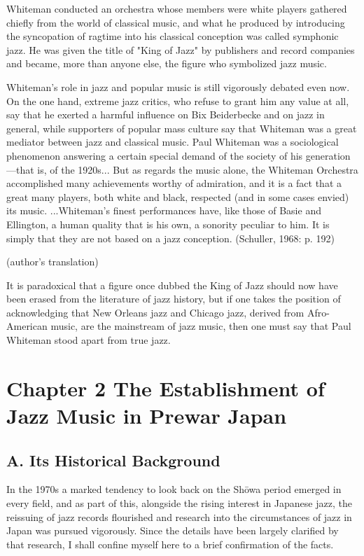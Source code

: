 Whiteman conducted an orchestra whose members were white players gathered chiefly from the world of classical music, and what he produced by introducing the syncopation of ragtime into his classical conception was called symphonic jazz. He was given the title of "King of Jazz" by publishers and record companies and became, more than anyone else, the figure who symbolized jazz music.

\begin{gquote}
Whiteman's role in jazz and popular music is still vigorously debated even now. On the one hand, extreme jazz critics, who refuse to grant him any value at all, say that he exerted a harmful influence on Bix Beiderbecke and on jazz in general, while supporters of popular mass culture say that Whiteman was a great mediator between jazz and classical music. Paul Whiteman was a sociological phenomenon answering a certain special demand of the society of his generation—that is, of the 1920s... But as regards the music alone, the Whiteman Orchestra accomplished many achievements worthy of admiration, and it is a fact that a great many players, both white and black, respected (and in some cases envied) its music. ...Whiteman's finest performances have, like those of Basie and Ellington, a human quality that is his own, a sonority peculiar to him. It is simply that they are not based on a jazz conception. (Schuller, 1968: p. 192)
\end{gquote}

(author's translation)

It is paradoxical that a figure once dubbed the King of Jazz should now have been erased from the literature of jazz history, but if one takes the position of acknowledging that New Orleans jazz and Chicago jazz, derived from Afro-American music, are the mainstream of jazz music, then one must say that Paul Whiteman stood apart from true jazz.

\section{Chapter 2  The Establishment of Jazz Music in Prewar Japan}

\subsection{A. Its Historical Background}

In the 1970s a marked tendency to look back on the Shōwa period emerged in every field, and as part of this, alongside the rising interest in Japanese jazz, the reissuing of jazz records flourished and research into the circumstances of jazz in Japan was pursued vigorously. Since the details have been largely clarified by that research, I shall confine myself here to a brief confirmation of the facts.

